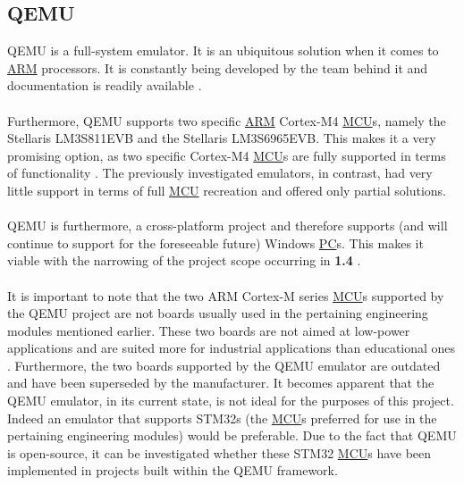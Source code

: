 \subsection{QEMU}
\label{qemu}
QEMU is a full-system emulator. It is an ubiquitous solution when it comes to \hyperref[listAbr]{ARM} processors. It is constantly being developed by the team behind it and documentation is readily available \cite{QEMU}.
\\\\
Furthermore, QEMU supports two specific \hyperref[listAbr]{ARM} Cortex-M4  \hyperref[listAbr]{MCU}s, namely the Stellaris LM3S811EVB and the Stellaris LM3S6965EVB. This makes it a very promising option, as two specific Cortex-M4 \hyperref[listAbr]{MCU}s are fully supported in terms of functionality \cite{QEMU}\cite{QEMUarm}. The previously investigated emulators, in contrast, had very little support in terms of full \hyperref[listAbr]{MCU} recreation and offered only partial solutions.
\\\\
QEMU is furthermore, a cross-platform project and therefore supports (and will continue to support for the foreseeable future) Windows \hyperref[listAbr]{PC}s. This makes it viable with the narrowing of the project scope occurring in \textbf{1.4 }. 
\\\\
It is important to note that the two ARM Cortex-M series \hyperref[listAbr]{MCU}s supported by the QEMU project are not boards usually used in the pertaining engineering modules mentioned earlier. These two boards are not aimed at low-power applications and are suited more for industrial applications than educational ones \cite{TexasInstruments2014}. Furthermore, the two boards supported by the QEMU emulator are outdated and have been superseded by the manufacturer. It becomes apparent that the QEMU emulator, in its current state, is not ideal for the purposes of this project. Indeed an emulator that supports STM32s (the \hyperref[listAbr]{MCU}s preferred for use in the pertaining engineering modules) would be preferable. Due to the fact that QEMU is open-source, it can be investigated whether these STM32 \hyperref[listAbr]{MCU}s have been implemented in projects built within the QEMU framework.

